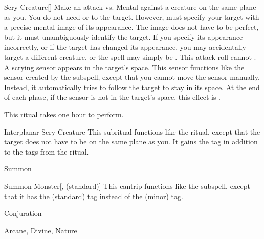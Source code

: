 \begin{ability}[\nth{4}]{Scry Creature}[]
Make an attack vs. Mental against a creature on the same plane as you.
You do not need  or  to the target.
However,  must specify your target with a precise mental image of its appearance.
The image does not have to be perfect, but it must unambiguously identify the target.
If you specify its appearance incorrectly, or if the target has changed its appearance, you may accidentally target a different creature, or the spell may simply be .
This attack roll cannot .
\hit A scrying sensor appears in the target's space.
This sensor functions like the sensor created by the  subspell, except that you cannot move the sensor manually.
Instead, it automatically tries to follow the target to stay in its space.
At the end of each phase, if the sensor is not in the target's space, this effect is .

This ritual takes one hour to perform.
\end{ability}
\vspace{0.25em}



\begin{ability}[\nth{7}]{Interplanar Scry Creature}
This subritual functions like the  ritual, except that the target does not have to be on the same plane as you.
It gains the  tag in addition to the tags from the  ritual.
\end{ability}
\vspace{0.25em}


\newpage
\begin{spellsection}{Summon}

\begin{spellheader}
\end{spellheader}


\begin{ability}{Summon Monster}[,  (standard)]
This cantrip functions like the  subspell, except that it has the  (standard) tag instead of the  (minor) tag.
\end{ability}




 Conjuration

 Arcane, Divine, Nature
\end{spellsection}


